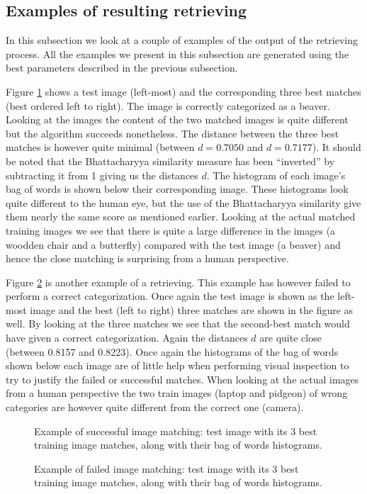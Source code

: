 \documentclass[11pt,a4paper]{article}
\begin{document}
\subsection{Examples of resulting retrieving}
In this subsection we look at a couple of examples of the output of the
retrieving process.
All the examples we present in this subsection are generated using the best
parameters described in the previous subsection.

Figure \ref{fig:results_11} shows a test image (left-most)
and the corresponding three best matches (best ordered left to right). The
image is correctly categorized as a beaver. Looking at the images the content
of the two matched images is quite different but the algorithm succeeds
nonetheless. The distance between the three best matches is however quite
minimal (between $d = 0.7050$ and $d = 0.7177$). It should be noted that the
Bhattacharyya similarity measure has been ``inverted'' by subtracting it from 1
giving us the distances $d$.
The histogram of each image's bag of words is shown below their
corresponding image. These histograms look quite different to the human eye,
but the use of the Bhattacharyya similarity give them nearly the same score as
mentioned earlier. Looking at the actual matched training images we see that
there is quite a large difference in the images (a woodden chair and a
butterfly) compared with the test image (a beaver) and hence the close matching
is surprising from a human perspective.

Figure \ref{fig:results_18} is another example of a retrieving. This example
has however failed to perform a correct categorization. Once again the test
image is shown as the left-most image and the best (left to right) three
matches are shown in the figure as well. By looking at the three matches we
see that the second-best match would have given a correct categorization.
Again the distances $d$ are quite close (between 0.8157 and 0.8223). Once
again the histograms of the bag of words shown below each image are of little
help when performing visual inspection to try to justify the failed or
successful matches. When looking at the actual images from a human perspective
the two train images (laptop and pidgeon) of wrong categories are however
quite different from the correct one (camera).
\begin{figure}[H]
\centering
{}
\caption{Example of successful image matching: test image with its 3 best
    training image matches, along with their bag of words histograms.}
\label{fig:results_11}
\end{figure}
%
\begin{figure}[H]
\centering
{}
\caption{Example of failed image matching: test image with its 3 best training
    image matches, along with their bag of words histograms.}
\label{fig:results_18}
\end{figure}
%
\end{document}
